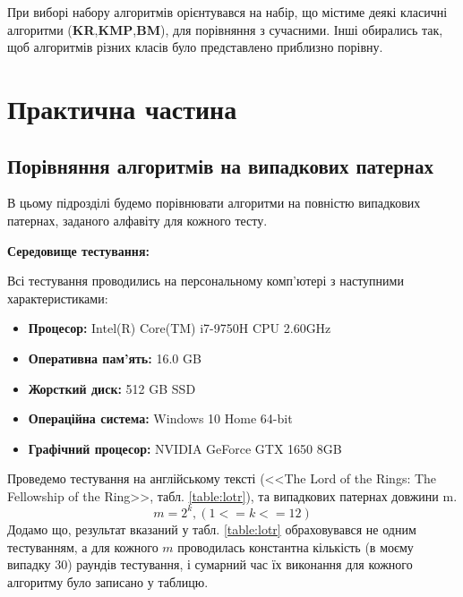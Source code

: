 \documentclass[a4paper,14pt]{extarticle} %
\begin{document}
	При виборі набору алгоритмів орієнтувався на набір, що містиме деякі класичні алгоритми (\textbf{KR},\textbf{KMP},\textbf{BM}), для порівняння з сучасними. Інші обирались так, щоб алгоритмів різних класів було представлено приблизно порівну.

	
	\newpage
	\section{Практична частина}
	
	\subsection{Порівняння алгоритмів на випадкових патернах}
	В цьому підрозділі будемо порівнювати алгоритми на повністю випадкових патернах, заданого алфавіту для кожного тесту. 

	\textbf{Середовище тестування:}

	Всі тестування проводились на персональному комп'ютері з наступними характеристиками:
	\begin{itemize}
		\item \textbf{Процесор:} Intel(R) Core(TM) i7-9750H CPU 2.60GHz
		\item \textbf{Оперативна пам'ять:} 16.0 GB
		\item \textbf{Жорсткий диск:} 512 GB SSD
		\item \textbf{Операційна система:} Windows 10 Home 64-bit
		\item \textbf{Графічний процесор:} NVIDIA GeForce GTX 1650 8GB
	\end{itemize}

	Проведемо тестування на англійському тексті (<<The Lord of the Rings: The Fellowship of the Ring>>, табл. \ref{table:lotr}), та випадкових патернах довжини m. $$m=2^k, (1<=k<=12)$$
	Додамо що, результат вказаний у табл. \ref{table:lotr} обраховувався не одним тестуванням, а для кожного $m$ проводилась константна кількість (в моєму випадку 30) раундів тестування, і сумарний час їх виконання для кожного алгоритму було записано у таблицю.
\end{document}
